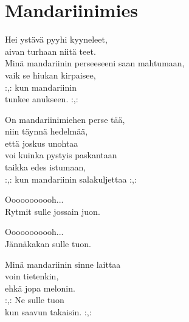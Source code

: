 \section{Mandariinimies}
Hei ystävä pyyhi kyyneleet,\\
aivan turhaan niitä teet.\\
Minä mandariinin perseeseeni saan mahtumaan,\\
vaik se hiukan kirpaisee,\\
:,: kun mandariinin \\
tunkee anukseen. :,:

On mandariinimiehen perse tää,\\
niin täynnä hedelmää,\\
että joskus unohtaa\\
voi kuinka pystyis paskantaan\\
taikka edes istumaan,\\
:,: kun mandariinin salakuljettaa :,: 

Ooooooooooh...\\
Rytmit sulle jossain juon.

Ooooooooooh...\\
Jännäkakan sulle tuon.

Minä mandariinin sinne laittaa\\
voin tietenkin,\\
ehkä jopa melonin.\\
:,: Ne sulle tuon \\
kun saavun takaisin. :,: